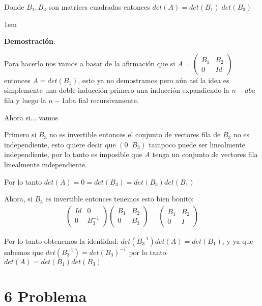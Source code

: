 \documentclass[12pt, fleqn]{article}                             %
\newenvironment{SmallIndentation}[1][0.75em]                    %
        {\begin{adjustwidth}{#1}{}\begin{footnotesize}}             %
        {\end{footnotesize}\end{adjustwidth}}                       %
\theoremstyle{break}                                            %
\newcommand{\pVector}[1]                                        %
        { \ensuremath{\begin{pmatrix}#1\end{pmatrix}} }             %
\begin{document}
    Donde $B_1, B_3$ son matrices cuadradas entonces $det(A) = det(B_1) \; det(B_3)$

    \begin{SmallIndentation}[1em]
        \textbf{Demostración}:

        Para hacerlo nos vamos a basar de la afirmación que si $A = \pVector{B_1 & B_2 \\ 0 & Id}$ entonces
        $A = det(B_1)$, esto ya no demostramos pero aún así la idea es simplemente una doble inducción primero
        una inducción expandiendo la $n-aba$ fila y luego la $n-1$aba fial recursivamente.

        Ahora si... vamos
        
        Primero si $B_3$ no es invertible entonces el conjunto de vectores fila de $B_3$
        no es independiente, esto quiere decir que $(0 \;\; B_3)$ tampoco puede ser linealmente
        independiente, por lo tanto es imposible que $A$ tenga un conjunto de vectores
        fila linealmente independiente.

        Por lo tanto $det(A) = 0 = det(B_3) = det(B_3) det(B_1)$

        Ahora, si $B_3$ es invertible entonces tenemos esto bien bonito:
        \begin{align*}
            \pVector{Id & 0 \\ 0 & B_3^{-1}} \pVector{B_1 & B_2 \\ 0 & B_3} = \pVector{B_1 & B_2 \\ 0 & I}
        \end{align*}

        Por lo tanto obtenemos la identidad:
        $det(B_3^{-1}) det(A) = det(B_1)$, y ya que sabemos que $det(B_3^{-1}) = det(B_3)^{-1}$ por lo tanto
        $det(A) = det(B_1) det(B_3)$
    
    \end{SmallIndentation}


\clearpage
\section{6 Problema}
\end{document}
